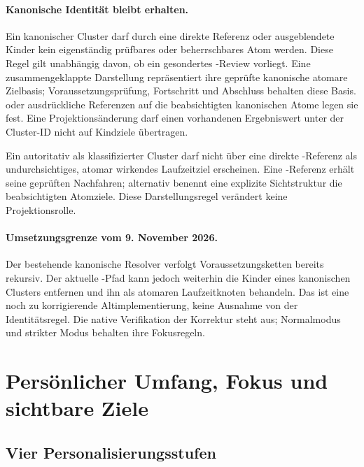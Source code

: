 \paragraph{Kanonische Identität bleibt erhalten.} Ein kanonischer Cluster
darf durch eine direkte Referenz oder ausgeblendete Kinder kein
eigenständig prüfbares oder beherrschbares Atom werden. Diese Regel gilt
unabhängig davon, ob ein gesondertes -Review vorliegt.
Eine zusammengeklappte Darstellung repräsentiert ihre geprüfte kanonische
atomare Zielbasis; Voraussetzungsprüfung, Fortschritt und Abschluss
behalten diese Basis.  oder ausdrückliche
Referenzen auf die beabsichtigten kanonischen Atome legen sie fest.
Eine Projektionsänderung darf einen vorhandenen Ergebniswert unter der
Cluster-ID nicht auf Kindziele übertragen.

Ein autoritativ als  klassifizierter Cluster
darf nicht über eine direkte -Referenz als
undurchsichtiges, atomar wirkendes Laufzeitziel erscheinen. Eine
-Referenz erhält seine geprüften Nachfahren;
alternativ benennt eine explizite Sichtstruktur die beabsichtigten
Atomziele. Diese Darstellungsregel verändert keine Projektionsrolle.

\paragraph{Umsetzungsgrenze vom 9. November 2026.} Der bestehende kanonische
Resolver verfolgt Voraussetzungsketten bereits rekursiv. Der aktuelle
-Pfad kann jedoch weiterhin die Kinder eines kanonischen
Clusters entfernen und ihn als atomaren Laufzeitknoten behandeln. Das ist
eine noch zu korrigierende Altimplementierung, keine Ausnahme von der
Identitätsregel. Die native Verifikation der Korrektur steht aus;
Normalmodus und strikter Modus behalten ihre Fokusregeln.


\section{Persönlicher Umfang, Fokus und sichtbare Ziele}
\label{sec:personal-scope}

\subsection{Vier Personalisierungsstufen}

